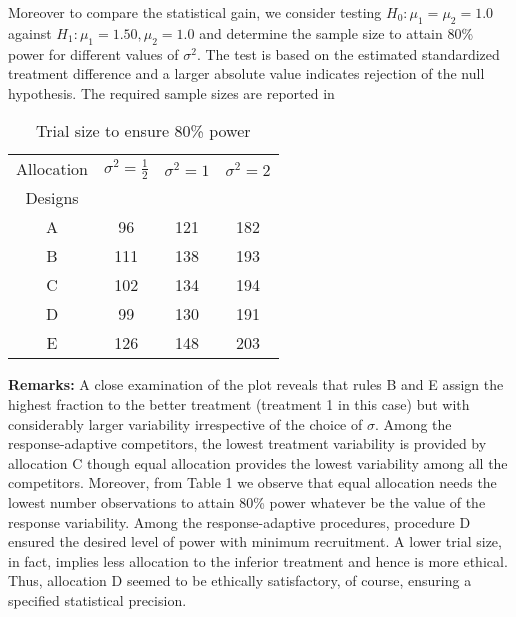 \newline
 \noindent Moreover to compare the statistical gain, we consider testing $H_{0}:\mu_{1}=\mu_{2}=1.0$ against $H_{1}:\mu_{1}=1.50, \mu_{2}=1.0$ and determine the sample size to attain 80\% power for different values of $\sigma^{2}$. The test is based on the estimated standardized treatment difference and a larger absolute value indicates rejection of the null hypothesis. The required sample sizes are reported in 


   
\begin{table}[htbp]
\footnotesize
\begin{center}
\caption{Trial size to ensure 80\% power}

\begin{tabular}{c|c|c|c}
 Allocation & $\sigma^{2}=\frac{1}{2}$ & $\sigma^{2}=1$ & $\sigma^{2}=2$ \\
   Designs &  &  &  \\

   A & 96 & 121 & 182 \\
   B & 111& 138 & 193 \\
   C & 102 & 134 & 194 \\
   D & 99 & 130 & 191 \\
   E & 126 & 148 & 203 \\

 \end{tabular}
 
\end{center}
\normalsize
\end{table}


 \noindent \textbf{Remarks:} A close examination of the plot reveals that rules B and E assign the highest fraction to the better treatment (treatment 1 in this case) but with considerably larger variability irrespective of the choice of $\sigma$. Among the response-adaptive competitors, the lowest treatment variability is provided by allocation C though equal allocation provides the lowest variability among all the competitors. Moreover, from Table 1 we observe that equal allocation needs the lowest number observations to attain 80\% power whatever be the value of the response variability. Among the response-adaptive procedures, procedure D ensured the desired level of power with minimum recruitment. A lower trial size, in fact,  implies less allocation to the inferior treatment and hence is more ethical. Thus, allocation D seemed to be ethically satisfactory, of course, ensuring a specified statistical precision.

